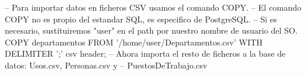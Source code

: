 \lstset{caption=Ejemplo de COPY,label=sql:copy}
\begin{SQL}
-- Para importar datos en ficheros CSV usamos el comando COPY.
-- El comando COPY no es propio del estandar SQL, es especifico de PostgreSQL.
-- Si es necesario, sustituiremos "user" en el path por nuestro nombre de usuario del SO.
COPY departamentos FROM '/home/user/Departamentos.csv' WITH DELIMITER ';' csv header;
-- Ahora importa el resto de ficheros a la base de datos: Usos.csv, Personas.csv y
-- PuestosDeTrabajo.csv
\end{SQL}
